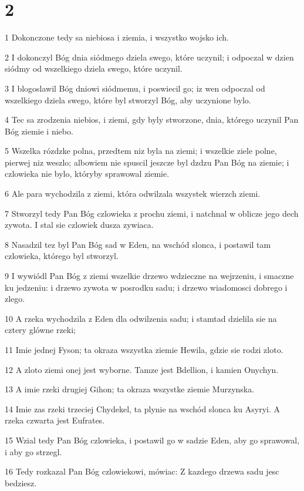 \chapter{2}

\par 1 Dokonczone tedy sa niebiosa i ziemia, i wszystko wojsko ich.
\par 2 I dokonczyl Bóg dnia siódmego dziela swego, które uczynil; i odpoczal w dzien siódmy od wszelkiego dziela swego, które uczynil.
\par 3 I blogoslawil Bóg dniowi siódmemu, i poswiecil go; iz wen odpoczal od wszelkiego dziela swego, które byl stworzyl Bóg, aby uczynione bylo.
\par 4 Tec sa zrodzenia niebios, i ziemi, gdy byly stworzone, dnia, którego uczynil Pan Bóg ziemie i niebo.
\par 5 Wszelka rózdzke polna, przedtem niz byla na ziemi; i wszelkie ziele polne, pierwej niz weszlo; albowiem nie spuscil jeszcze byl dzdzu Pan Bóg na ziemie; i czlowieka nie bylo, któryby sprawowal ziemie.
\par 6 Ale para wychodzila z ziemi, która odwilzala wszystek wierzch ziemi.
\par 7 Stworzyl tedy Pan Bóg czlowieka z prochu ziemi, i natchnal w oblicze jego dech zywota. I stal sie czlowiek dusza zywiaca.
\par 8 Nasadzil tez byl Pan Bóg sad w Eden, na wschód slonca, i postawil tam czlowieka, którego byl stworzyl.
\par 9 I wywiódl Pan Bóg z ziemi wszelkie drzewo wdzieczne na wejrzeniu, i smaczne ku jedzeniu: i drzewo zywota w posrodku sadu; i drzewo wiadomosci dobrego i zlego.
\par 10 A rzeka wychodzila z Eden dla odwilzenia sadu; i stamtad dzielila sie na cztery glówne rzeki;
\par 11 Imie jednej Fyson; ta okraza wszystka ziemie Hewila, gdzie sie rodzi zloto.
\par 12 A zloto ziemi onej jest wyborne. Tamze jest Bdellion, i kamien Onychyn.
\par 13 A imie rzeki drugiej Gihon; ta okraza wszystke ziemie Murzynska.
\par 14 Imie zas rzeki trzeciej Chydekel, ta plynie na wschód slonca ku Asyryi. A rzeka czwarta jest Eufrates.
\par 15 Wzial tedy Pan Bóg czlowieka, i postawil go w sadzie Eden, aby go sprawowal, i aby go strzegl.
\par 16 Tedy rozkazal Pan Bóg czlowiekowi, mówiac: Z kazdego drzewa sadu jesc bedziesz.
